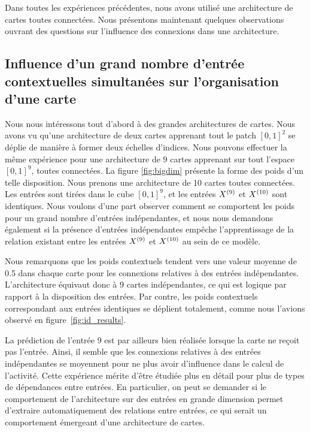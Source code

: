 \documentclass[../main]{subfiles}
\begin{document}
Dans toutes les expériences précédentes, nous avons utilisé une architecture de cartes toutes connectées. Nous présentons maintenant quelques observations ouvrant des questions sur l'influence des connexions dans une architecture.

\subsection{Influence d'un grand nombre d'entrée contextuelles simultanées sur l'organisation d'une carte}

Nous nous intéressons tout d'abord à des grandes architectures de cartes. Nous avons vu qu'une architecture de deux cartes apprenant tout le patch $[0,1]^2$ se déplie de manière à former deux échelles d'indices. 
Nous pouvons effectuer la même expérience pour une architecture de $9$ cartes apprenant sur tout l'espace $[0,1]^9$, toutes connectées.
La figure \ref{fig:bigdim} présente la forme des poids d'un telle disposition. Nous prenons une architecture de 10 cartes toutes connectées. 
Les entrées sont tirées dans le cube $[0,1]^9$, et les entrées $X^{({9})}$ et $X^{({10})}$ sont identiques. Nous voulons d'une part observer comment se comportent les poids pour un grand nombre d'entrées indépendantes, et nous nous demandons également si la présence d'entrées indépendantes empêche l'apprentissage de la relation existant entre les entrées $X^{({9})}$ et $X^{({10})}$ au sein de ce modèle.

Nous remarquons que les poids contextuels tendent vers une valeur moyenne de 0.5 dans chaque carte pour les connexions relatives à des entrées indépendantes.
L'architecture équivaut donc à 9 cartes indépendantes, ce qui est logique par rapport à la disposition des entrées. Par contre, les poids contextuels correspondant aux entrées identiques se déplient totalement, comme nous l'avions observé en figure~\ref{fig:id_results}.

La prédiction de l'entrée $9$ est par ailleurs bien réalisée lorsque la carte ne reçoit pas l'entrée. Ainsi, il semble que les connexions relatives à des entrées indépendantes se moyennent pour ne plus avoir d'influence dans le calcul de l'activité.
Cette expérience mérite d'être étudiée plus en détail pour plus de types de dépendances entre entrées. 
En particulier, on peut se demander si le comportement de l'architecture sur des entrées en grande dimension permet d'extraire automatiquement des relations entre entrées, ce qui serait un comportement émergeant d'une architecture de cartes.
\end{document}
